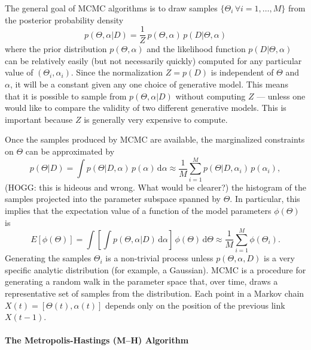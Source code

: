 \documentclass[12pt,preprint]{aastex}
\newcommand{\dd}{\mathrm{d}}
\renewcommand{\vector}[1]{#1}
\newcommand{\pr}[1]{\ensuremath{p(#1)}}
\newcommand{\model}{\ensuremath{\vector{\Theta}}}
\newcommand{\data}{\ensuremath{\vector{D}}}
\newcommand{\nuisance}{\ensuremath{\vector{\alpha}}}
\newcommand{\link}{\ensuremath{X}}
\begin{document}
The general goal of MCMC algorithms is to draw samples
$\{ \model_i \, \forall i=1, \ldots, M \}$ from
the posterior probability density
\begin{equation}
    \pr{\model, \nuisance | \data} = \frac{1}{Z}\,\pr{\model, \nuisance}
            \, \pr{\data | \model, \nuisance}
\end{equation}
where the prior distribution $\pr{\model, \nuisance}$ and the likelihood
function $\pr{\data|\model,\nuisance}$ can be relatively easily (but not
necessarily quickly) computed for any particular value of
$(\model_i, \nuisance_i)$. Since the normalization $Z=\pr{\data}$ is
independent of $\model$ and $\nuisance$, it will be a constant
given any one choice of generative model. This means that it is possible
to sample from \pr{\model, \nuisance | \data} without computing $Z$ ---
unless one would like to compare the validity of two different generative
models. This is important because $Z$ is generally very expensive to
compute.

Once the samples
produced by MCMC are available, the marginalized constraints on $\model$
can be approximated by
\begin{equation}
    \pr{\model | \data} = \int \pr{\model | \data, \nuisance} \,
        \pr{\nuisance} \, \dd  \nuisance
    \approx \frac{1}{M}\sum_{i=1}^M \pr{\model | \data, \nuisance_i}
        \, \pr{\nuisance_i},
\end{equation}
(HOGG: this is hideous and wrong. What would be clearer?)
the histogram of the samples projected into the parameter subspace spanned
by $\model$. In particular, this implies that the
expectation value of a function of the model parameters $\phi(\model)$ is
\begin{equation}
    E[\phi(\model)] = \int
            \left [ \int \pr{\model, \nuisance | \data}
            \, \dd \nuisance \right ] \, \phi (\model) \, \dd\model
            \approx \frac{1}{M} \sum_{i=1} ^M \phi(\model_i) .
\end{equation}
Generating the samples $\model_i$ is a non-trivial process unless
$\pr{\model, \nuisance, \data}$ is a very specific analytic distribution
(for example, a Gaussian). MCMC is a procedure for generating a random walk
in the parameter space that, over time, draws a representative set
of samples from the distribution. Each point in a Markov chain
$\link (t) = [\model(t), \nuisance(t)]$
depends only on the position of the previous link $\link (t-1)$.

\paragraph{The Metropolis-Hastings (M--H) Algorithm}
\end{document}
